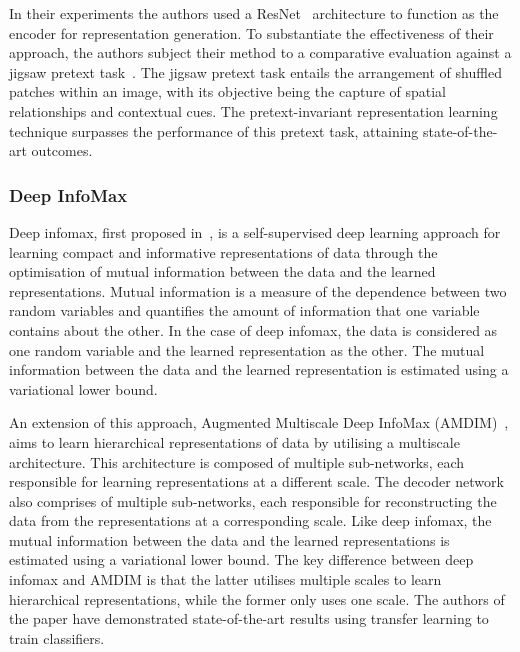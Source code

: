 In their experiments the authors used a ResNet~\citep{he2016deep} architecture to function as the encoder for representation generation. To substantiate the effectiveness of their approach, the authors subject their method to a comparative evaluation against a jigsaw pretext task~\citep{noroozi2016unsupervised}. The jigsaw pretext task entails the arrangement of shuffled patches within an image, with its objective being the capture of spatial relationships and contextual cues. The pretext-invariant representation learning technique surpasses the performance of this pretext task, attaining state-of-the-art outcomes.

\subsubsection{Deep InfoMax}
\label{subsubsec:DIM}
Deep infomax, first proposed in~\citep{hjelm2018learning}, is a self-supervised deep learning approach for learning compact and informative representations of data through the optimisation of mutual information between the data and the learned representations. Mutual information is a measure of the dependence between two random variables and quantifies the amount of information that one variable contains about the other. In the case of deep infomax, the data is considered as one random variable and the learned representation as the other. The mutual information between the data and the learned representation is estimated using a variational lower bound.

An extension of this approach, Augmented Multiscale Deep InfoMax (AMDIM)~\citep{bachman2019learning}, aims to learn hierarchical representations of data by utilising a multiscale architecture. This architecture is composed of multiple sub-networks, each responsible for learning representations at a different scale. The decoder network also comprises of multiple sub-networks, each responsible for reconstructing the data from the representations at a corresponding scale. Like deep infomax, the mutual information between the data and the learned representations is estimated using a variational lower bound. The key difference between deep infomax and AMDIM is that the latter utilises multiple scales to learn hierarchical representations, while the former only uses one scale. The authors of the paper have demonstrated state-of-the-art results using transfer learning to train classifiers.

